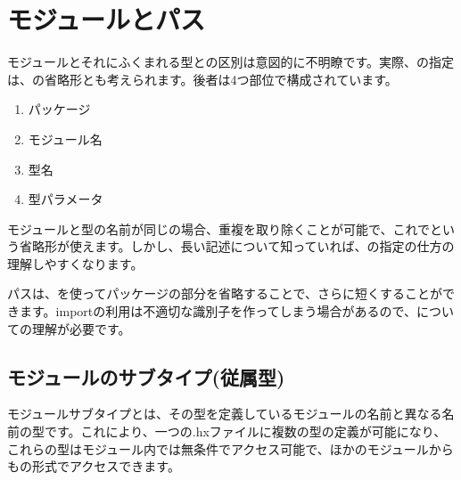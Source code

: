 \section{モジュールとパス}
\label{type-system-modules-and-paths}


モジュールとそれにふくまれる型との区別は意図的に不明瞭です。実際、の指定は、の省略形とも考えられます。後者は4つ部位で構成されています。

\begin{enumerate}
	\item パッケージ 
	\item モジュール名 
	\item 型名 
	\item 型パラメータ 
\end{enumerate}

モジュールと型の名前が同じの場合、重複を取り除くことが可能で、これでという省略形が使えます。しかし、長い記述について知っていれば、の指定の仕方の理解しやすくなります。

パスは、を使ってパッケージの部分を省略することで、さらに短くすることができます。importの利用は不適切な識別子を作ってしまう場合があるので、についての理解が必要です。



\subsection{モジュールのサブタイプ(従属型)}
\label{type-system-module-sub-types}

モジュールサブタイプとは、その型を定義しているモジュールの名前と異なる名前の型です。これにより、一つの.hxファイルに複数の型の定義が可能になり、これらの型はモジュール内では無条件でアクセス可能で、ほかのモジュールからもの形式でアクセスできます。

